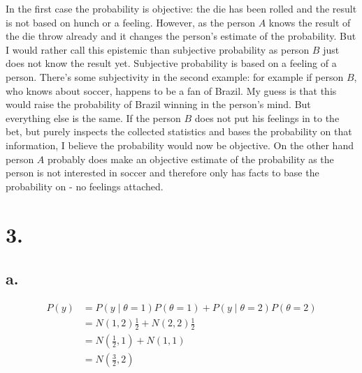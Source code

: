 \documentclass[11pt]{amsart}
\begin{document}
In the first case the probability is objective: the die has been rolled and the result is not based on hunch or a feeling. However, as the person $A$ knows the result of the die throw already and it changes the person's estimate of the probability. But I would rather call this epistemic than subjective probability as person $B$ just does not know the result yet. Subjective probability is based on a feeling of a person. There's some subjectivity in the second example: for example if person $B$, who knows about soccer, happens to be a fan of Brazil. My guess is that this would raise the probability of Brazil winning in the person's mind. But everything else is the same. If the person $B$ does not put his feelings in to the bet, but purely inspects the collected statistics and bases the probability on that information, I believe the probability would now be objective. On the other hand person $A$ probably does make an objective estimate of the probability as the person is not interested in soccer and therefore only has facts to base the probability on - no feelings attached.

\section*{3.}
\subsection*{a.}

\begin{equation*}
    \begin{aligned}
        P(y)
        &= P(y \mid \theta = 1) P(\theta = 1) + P(y \mid \theta = 2) P(\theta = 2) \\
        &= N(1, 2)\frac{1}{2} + N(2, 2)\frac{1}{2} \\
        &= N(\frac{1}{2}, 1) + N(1, 1) \\
        &= N(\frac{3}{2}, 2)
    \end{aligned}
\end{equation*}
\end{document}
